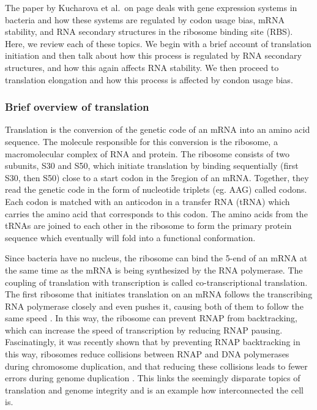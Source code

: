 %
The paper by Kucharova et al.\ on page \pageref{vero_paper} deals with gene
expression systems in bacteria and how these systems are regulated by codon
usage bias, mRNA stability, and RNA secondary structures in the ribosome
binding site (RBS). Here, we review each of these topics. We begin with a brief
account of translation initiation and then talk about how this process is
regulated by RNA secondary structures, and how this again affects RNA
stability. We then proceed to translation elongation and how this process is
affected by condon usage bias.

\subsubsection{Brief overview of translation}
Translation is the conversion of the genetic code of an mRNA into an amino acid
sequence. The molecule responsible for this conversion is the ribosome, a
macromolecular complex of RNA and protein. The ribosome consists of two
subunits, S30 and S50, which initiate translation by binding sequentially
(first S30, then S50) close to a start codon in the 5\ppp region of an mRNA.
Together, they read the genetic code in the form of nucleotide triplets (eg.
AAG) called codons. Each codon is matched with an anticodon in a transfer RNA
(tRNA) which carries the amino acid that corresponds to this codon. The amino
acids from the tRNAs are joined to each other in the ribosome to form the
primary protein sequence which eventually will fold into a functional
conformation.

Since bacteria have no nucleus, the ribosome can bind the 5\ppp-end of an mRNA at
the same time as the mRNA is being synthesized by the RNA polymerase. The
coupling of translation with transcription is called co-transcriptional
translation. The first ribosome that initiates translation on an mRNA follows
the transcribing RNA polymerase closely and even pushes it, causing both of
them to follow the same speed \cite{proshkin_cooperation_2010}. In this way,
the ribosome can prevent RNAP from backtracking, which can increase the speed
of transcription by reducing RNAP pausing. Fascinatingly, it was recently shown
that by preventing RNAP backtracking in this way, ribosomes reduce collisions
between RNAP and DNA polymerases during chromosome duplication, and that
reducing these collisions leads to fewer errors during genome duplication
\cite{dutta_linking_2011}. This links the seemingly disparate topics of
translation and genome integrity and is an example how interconnected the cell
is.

